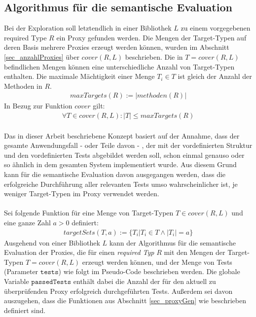 \subsection{Algorithmus für die semantische Evaluation}\label{sec_semEvalAlgo}
Bei der Exploration soll letztendlich in einer Bibliothek $L$ zu einem vorgegebenen required Type $R$ ein Proxy gefunden werden. Die Mengen der Target-Typen auf deren Basis mehrere Proxies erzeugt werden können, wurden im Abschnitt \ref{sec_anzahlProxies} über $\mathit{cover(R,L)}$ beschrieben. Die in $T = \mathit{cover(R,L)}$ befindlichen Mengen können eine unterschiedliche Anzahl von Target-Typen enthalten. Die maximale Mächtigkeit einer Menge $T_i \in T$ ist gleich der Anzahl der Methoden in $R$.
\begin{gather*}
\mathit{maxTargets(R)} := |\mathit{methoden(R)}|
\end{gather*}
\noindent
In Bezug zur Funktion $\mathit{cover}$ gilt:
\begin{gather*}
\forall T \in \mathit{cover(R,L)} : |T| \leq \mathit{maxTargets(R)}
\end{gather*}
\noindent
\\
Das in dieser Arbeit beschriebene Konzept basiert auf der Annahme, dass der gesamte Anwendungsfall - oder Teile davon - , der mit der vordefinierten Struktur und den vordefinierten Tests abgebildet werden soll, schon einmal genauso oder so ähnlich in dem gesamten System implementiert wurde. Aus diesem Grund kann für die semantische Evaluation davon ausgegangen werden, dass die erfolgreiche Durchführung aller relevanten Tests umso wahrscheinlicher ist, je weniger Target-Typen im Proxy verwendet werden.
\\\\
Sei folgende Funktion für eine Menge von Target-Typen $T \in \mathit{cover(R,L)}$ und eine ganze Zahl $a > 0$ definiert:
\begin{gather*}
\mathit{targetSets(T,a)} := \{T_i | T_i \in T \wedge |T_i| = a\}
\end{gather*}
\noindent
Ausgehend von einer Bibliothek $L$ kann der Algorithmus für die semantische Evaluation der Proxies, die für einen \emph{required Typ} $R$ mit den Mengen der Target-Typen $T = \mathit{cover(R, L)}$ erzeugt werden können, und der Menge von Tests (Parameter $\texttt{tests}$) wie folgt im Pseudo-Code beschrieben werden. Die globale Variable $\texttt{passedTests}$ enthält dabei die Anzahl der für den aktuell zu überprüfenden Proxy erfolgreich durchgeführten Tests. Außerdem sei davon auszugehen, dass die Funktionen aus Abschnitt \ref{sec_proxyGen} wie beschrieben definiert sind.
